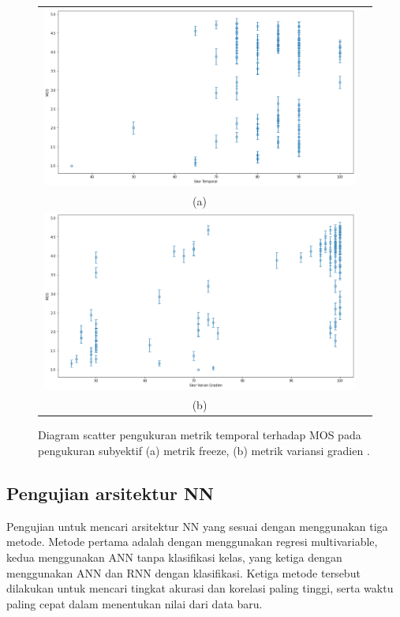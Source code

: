 \begin{figure}[H]
	\vspace{-0.2cm}
	\begin{center}
		\begin{tabular}{cc}
			\includegraphics[width=1\linewidth]{bab4/Gambar/mos-temp.png} \\
			(a)  \\
			\includegraphics[width=1\linewidth]{bab4/Gambar/mos-grad.png} \\
			(b) \\
		\end{tabular}
	\end{center}
	\vspace{-0.1cm}
	\caption{Diagram scatter pengukuran metrik temporal terhadap MOS pada pengukuran subyektif (a) metrik freeze, (b) metrik variansi gradien .}
	\label{metrik-temp}
\end{figure}
\newpage


\subsection{Pengujian arsitektur NN}
\hspace{1,2cm}
Pengujian untuk mencari arsitektur NN yang sesuai dengan menggunakan tiga metode. Metode pertama adalah dengan menggunakan regresi multivariable, kedua menggunakan ANN tanpa klasifikasi kelas, yang ketiga dengan menggunakan ANN dan RNN dengan klasifikasi. Ketiga metode tersebut dilakukan untuk mencari tingkat akurasi dan korelasi paling tinggi, serta waktu paling cepat dalam menentukan nilai dari data baru.

